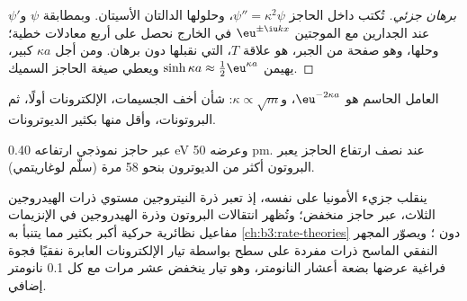 \begin{proof}[برهان جزئي]
تُكتب  داخل الحاجز $\psi'' = \kappa^2\psi$، 
وحلولها الدالتان الأسيتان. وبمطابقة $\psi$ و$\psi'$ عند
الجدارين مع الموجتين $\eu^{\pm\iu kx}$ في الخارج نحصل على أربع معادلات خطية؛ 
وحلها، وهو صفحة من الجبر، هو علاقة $T$، التي نقبلها دون برهان. ومن أجل
$\kappa a$ كبير، يهيمن $\sinh\kappa a \approx \frac12\eu^{\kappa a}$ 
ويعطي صيغة الحاجز السميك.
\end{proof}

العامل الحاسم هو $\eu^{-2\kappa a}$، و$\kappa \propto \sqrt m$:
 شأن أخف الجسيمات، الإلكترونات أولًا، ثم
البروتونات، وأقل منها بكثير الديوترونات.

\begin{omfigure}

{\small {} عبر حاجز نموذجي ارتفاعه 0.40 eV
وعرضه 50 pm. عند نصف ارتفاع الحاجز يعبر البروتون أكثر من الديوترون
بنحو 58 مرة (سلّم لوغاريتمي).}
\end{omfigure}

\begin{remark}\label{rem:b3:quantum-model-systems:where}
ينقلب جزيء الأمونيا على نفسه، إذ تعبر ذرة النيتروجين
مستوي ذرات الهيدروجين الثلاث،  عبر حاجز منخفض؛ وتُظهر انتقالات
البروتون وذرة الهيدروجين في الإنزيمات مفاعيل نظائرية حركية أكبر بكثير
مما يتنبأ به \cref{ch:b3:rate-theories} دون ؛ ويصوّر
المجهر النفقي الماسح ذرات مفردة على سطح بواسطة
تيار الإلكترونات العابرة نفقيًا فجوة فراغية عرضها بضعة أعشار
النانومتر، وهو تيار ينخفض عشر مرات مع كل 0.1 نانومتر إضافي.
\end{remark}

